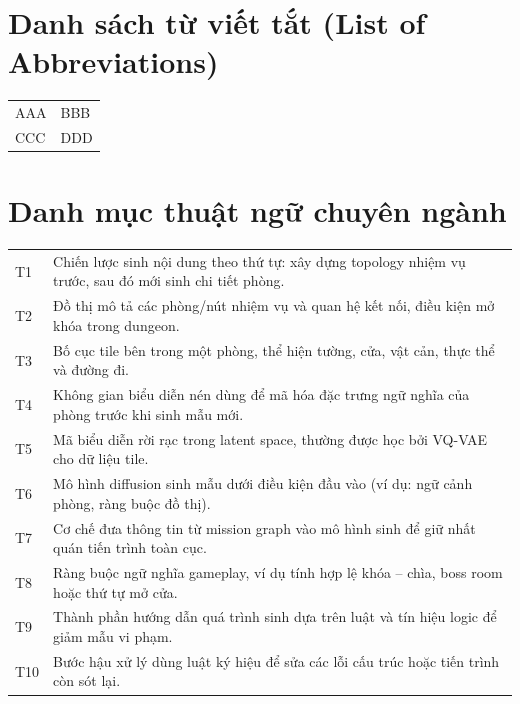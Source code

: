 ﻿\documentclass[12pt]{extreport}
\begin{document}
\setcounter{page}{6}
\chapter*{Danh sách từ viết tắt (List of Abbreviations)}
\begin{tabular}{p{}p{}}
AAA & BBB \\
CCC & DDD \\
\end{tabular}
\clearpage
\chapter*{Danh mục thuật ngữ chuyên ngành}
\begin{center}
\begin{tabular}{p{}p{}}
T1 & Chiến lược sinh nội dung theo thứ tự: xây dựng topology nhiệm vụ trước, sau đó mới sinh chi tiết phòng. \\
T2 & Đồ thị mô tả các phòng/nút nhiệm vụ và quan hệ kết nối, điều kiện mở khóa trong dungeon. \\
T3 & Bố cục tile bên trong một phòng, thể hiện tường, cửa, vật cản, thực thể và đường đi. \\
T4 & Không gian biểu diễn nén dùng để mã hóa đặc trưng ngữ nghĩa của phòng trước khi sinh mẫu mới. \\
T5 & Mã biểu diễn rời rạc trong latent space, thường được học bởi VQ-VAE cho dữ liệu tile. \\
T6 & Mô hình diffusion sinh mẫu dưới điều kiện đầu vào (ví dụ: ngữ cảnh phòng, ràng buộc đồ thị). \\
T7 & Cơ chế đưa thông tin từ mission graph vào mô hình sinh để giữ nhất quán tiến trình toàn cục. \\
T8 & Ràng buộc ngữ nghĩa gameplay, ví dụ tính hợp lệ khóa -- chìa, boss room hoặc thứ tự mở cửa. \\
T9 & Thành phần hướng dẫn quá trình sinh dựa trên luật và tín hiệu logic để giảm mẫu vi phạm. \\
T10 & Bước hậu xử lý dùng luật ký hiệu để sửa các lỗi cấu trúc hoặc tiến trình còn sót lại. \\
\end{tabular}
\end{center}
\end{document}
